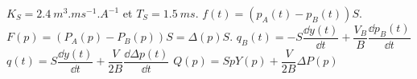 \begin{corrigebox}[Corrigé]
$K_S = \SI{2,4}{m^3.ms^{-1}.A^{-1}}$ et $T_S = \SI{1,5}{ms}$.
$f(t)=\left(p_A(t)-p_B(t)\right)S$.
$F(p)=\left(P_A(p)-P_B(p)\right)S=\Delta (p)S$.
$q_B(t)=-S\dfrac{\dd y(t)}{\dd t}+\dfrac{V_B}{B}\dfrac{\dd p_B(t)}{\dd t}$
$q(t)=S\dfrac{\dd y(t)}{\dd t}+\dfrac{V}{2B}\dfrac{\dd \Delta p(t)}{\dd t}$
$Q(p)=SpY(p)+\dfrac{V}{2B}\Delta P (p)$
\end{corrigebox}
